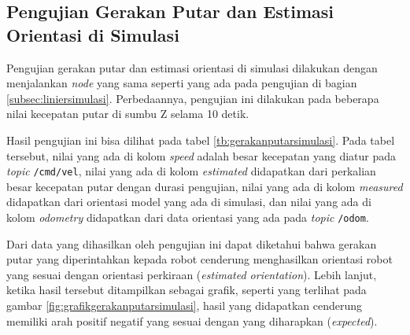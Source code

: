\subsection{Pengujian Gerakan Putar dan Estimasi Orientasi di Simulasi}
\label{subsec:putarsimulasi}

Pengujian gerakan putar dan estimasi orientasi di simulasi dilakukan dengan menjalankan \emph{node} yang sama seperti yang ada pada pengujian di bagian \ref{subsec:liniersimulasi}.
Perbedaannya, pengujian ini dilakukan pada beberapa nilai kecepatan putar di sumbu Z selama 10 detik.

Hasil pengujian ini bisa dilihat pada tabel \ref{tb:gerakanputarsimulasi}.
Pada tabel tersebut, nilai yang ada di kolom \emph{speed} adalah besar kecepatan yang diatur pada \emph{topic} \lstinline{/cmd/vel},
  nilai yang ada di kolom \emph{estimated} didapatkan dari perkalian besar kecepatan putar dengan durasi pengujian,
  nilai yang ada di kolom \emph{measured} didapatkan dari orientasi model yang ada di simulasi,
  dan nilai yang ada di kolom \emph{odometry} didapatkan dari data orientasi yang ada pada \emph{topic} \lstinline{/odom}.



Dari data yang dihasilkan oleh pengujian ini dapat diketahui bahwa gerakan putar yang diperintahkan kepada robot cenderung menghasilkan orientasi robot yang sesuai dengan orientasi perkiraan (\emph{estimated orientation}).
Lebih lanjut, ketika hasil tersebut ditampilkan sebagai grafik,
  seperti yang terlihat pada gambar \ref{fig:grafikgerakanputarsimulasi},
  hasil yang didapatkan cenderung memiliki arah positif negatif yang sesuai dengan yang diharapkan (\emph{expected}).


